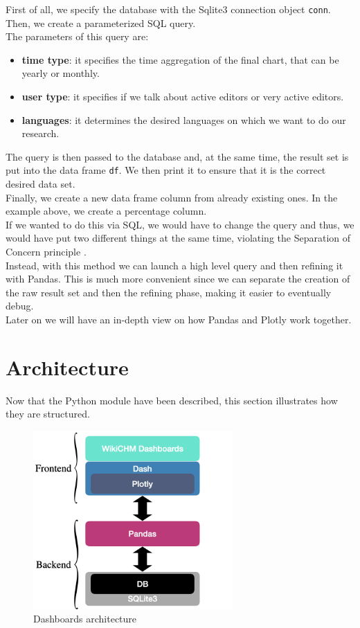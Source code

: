 First of all, we specify the database with the Sqlite3 connection object \verb#conn#. Then, we create a parameterized SQL query.\\
The parameters of this query are:
\begin{itemize}
    \item \textbf{time type}: it specifies the time aggregation of the final chart, that can be yearly or monthly.
    \item \textbf{user type}: it specifies if we talk about active editors or very active editors.
    \item \textbf{languages}: it determines the desired languages on which we want to do our research.
\end{itemize}
The query is then passed to the database and, at the same time, the result set is put into the data frame \verb#df#. We then print it to ensure that it is the correct desired data set.\\
Finally, we create a new data frame column from already existing ones. In the example above, we create a percentage column.\\ 
If we wanted to do this via SQL, we would have to change the query and thus, we would have put two different things at the same time, violating the Separation of Concern principle \cite{soc}.\\ Instead, with this method we can launch a high level query and then refining it with Pandas. This is much more convenient since we can separate the creation of the raw result set and then the refining phase, making it easier to eventually debug.\\
Later on we will have an in-depth view on how Pandas and Plotly work together.

\section{Architecture}
\label{sec:architecture}
Now that the Python module have been described, this section illustrates how they are structured.

\begin{figure}[!ht]
  \centering
  \includegraphics[width=3in]{img/architecture.png}
  \caption{Dashboards architecture}
  \label{fig:arch}
\end{figure}

